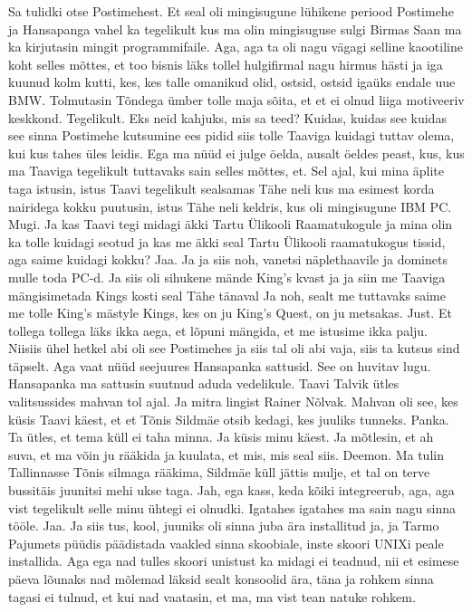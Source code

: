 Sa tulidki otse Postimehest.
Et seal oli mingisugune lühikene periood Postimehe ja Hansapanga vahel ka tegelikult kus ma olin mingisuguse sulgi Birmas
Saan ma ka kirjutasin mingit programmifaile. Aga, aga ta oli nagu vägagi selline kaootiline koht selles mõttes, et too bisnis läks tollel hulgifirmal nagu hirmus hästi ja iga kuunud kolm kutti, kes, kes talle omanikud olid, ostsid, ostsid igaüks endale uue BMW. Tolmutasin Tõndega ümber tolle maja sõita, et et ei olnud liiga motiveeriv keskkond. Tegelikult.
Eks neid kahjuks, mis sa teed? Kuidas, kuidas see kuidas see sinna Postimehe kutsumine ees pidid siis tolle Taaviga kuidagi tuttav olema, kui kus tahes üles leidis.
Ega ma nüüd ei julge öelda, ausalt öeldes peast, kus, kus ma Taaviga tegelikult tuttavaks sain selles mõttes, et.
Sel ajal, kui mina äplite taga istusin, istus Taavi tegelikult sealsamas Tähe neli kus ma esimest korda nairidega kokku puutusin, istus Tähe neli keldris, kus oli mingisugune IBM PC.
Mugi.
Ja kas Taavi tegi midagi äkki Tartu Ülikooli Raamatukogule ja mina olin ka tolle kuidagi seotud ja kas me äkki seal Tartu Ülikooli raamatukogus tissid, aga saime kuidagi kokku?
Jaa.
Ja ja siis noh, vanetsi näplethaavile ja dominets mulle toda PC-d. Ja siis oli sihukene mände King's kvast ja ja siin me Taaviga mängisimetada Kings kosti seal Tähe tänaval
Ja noh, sealt me tuttavaks saime me tolle King's mästyle
Kings, kes on ju King's Quest, on ju metsakas. Just.
Et tollega tollega läks ikka aega, et lõpuni mängida, et me istusime ikka palju.
Niisiis ühel hetkel abi oli see Postimehes ja siis tal oli abi vaja, siis ta kutsus sind täpselt. Aga vaat nüüd seejuures Hansapanka sattusid. See on huvitav lugu.
Hansapanka ma sattusin suutnud aduda vedelikule. Taavi Talvik ütles valitsussides mahvan tol ajal. Ja mitra lingist Rainer Nõlvak. Mahvan oli see, kes küsis Taavi käest, et et Tõnis Sildmäe otsib kedagi, kes juuliks tunneks.
Panka.
Ta ütles, et tema küll ei taha minna. Ja küsis minu käest. Ja mõtlesin, et ah suva, et ma võin ju rääkida ja kuulata, et mis, mis seal siis. Deemon. Ma tulin Tallinnasse Tõnis silmaga rääkima, Sildmäe küll jättis mulje, et tal on terve bussitäis juunitsi mehi ukse taga. Jah, ega kass, keda kõiki integreerub, aga, aga vist tegelikult selle minu ühtegi ei olnudki. Igatahes igatahes ma sain nagu sinna tööle.
Jaa.
Ja siis tus, kool, juuniks oli sinna juba ära installitud ja, ja Tarmo Pajumets püüdis päädistada vaakled sinna skoobiale, inste skoori UNIXi peale installida. Aga ega nad tulles skoori unistust ka midagi ei teadnud, nii et esimese päeva lõunaks nad mõlemad läksid sealt konsoolid ära, täna ja rohkem sinna tagasi ei tulnud, et kui nad vaatasin, et ma, ma vist tean natuke rohkem.
